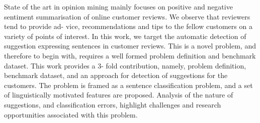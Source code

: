 State of the art in opinion mining mainly focuses on positive and negative sentiment summarisation of online customer reviews. We observe that reviewers tend to provide ad- vice, recommendations and tips to the fellow customers on a variety of points of interest. In this work, we target the automatic detection of suggestion expressing sentences in customer reviews. This is a novel problem, and therefore to begin with, requires a well formed problem definition and benchmark dataset. This work provides a 3- fold contribution, namely, problem definition, benchmark dataset, and an approach for detection of suggestions for the customers. The problem is framed as a sentence classification problem, and a set of linguistically motivated features are proposed. Analysis of the nature of suggestions, and classification errors, highlight challenges and research opportunities associated with this problem.
